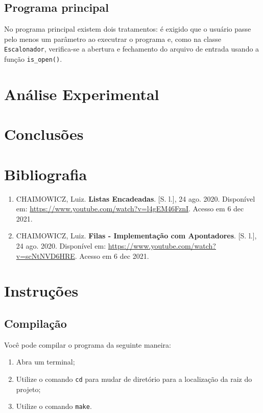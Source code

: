 \documentclass{article}
\def\code#1{\texttt{#1}}
\begin{document}
\subsection{Programa principal}

No programa principal existem dois tratamentos: é exigido que o usuário passe pelo menos um parâmetro ao executrar o programa e, como na classe \code{Escalonador}, verifica-se a abertura e fechamento do arquivo de entrada usando a função \code{is\_open()}. 

\section{Análise Experimental}

\section{Conclusões}

\section{Bibliografia}

\begin{enumerate}

    \item CHAIMOWICZ, Luiz. \textbf{Listas Encadeadas}. [S. l.], 24 ago. 2020. Disponível em: \url{https://www.youtube.com/watch?v=l4gEM46FznI}. Acesso em 6 dec 2021.

    \item CHAIMOWICZ, Luiz. \textbf{Filas - Implementação com Apontadores}. [S. l.], 24 ago. 2020. Disponível em: \url{https://www.youtube.com/watch?v=scNtNVD6HRE}. Acesso em 6 dec 2021.
        
\end{enumerate}


\newpage
\section*{Instruções}

\subsection*{Compilação}

Você pode compilar o programa da seguinte maneira:

\begin{enumerate}
    \item Abra um terminal;
    \item Utilize o comando \code{cd} para mudar de diretório para a localização da raiz do projeto;
    \item Utilize o comando \code{make}. 
\end{enumerate}
\end{document}
